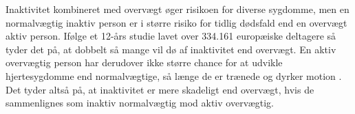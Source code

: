 Inaktivitet kombineret med overvægt øger risikoen for diverse sygdomme, men en normalvægtig inaktiv person er i større risiko for tidlig dødsfald end en overvægt aktiv person. Ifølge et 12-års studie lavet over 334.161 europæiske deltagere så tyder det på, at dobbelt så mange vil dø af inaktivitet end overvægt. \citep{Ekelund2015} En aktiv overvægtig person har derudover ikke større chance for at udvikle hjertesygdomme end normalvægtige, så længe de er trænede og dyrker motion \citep{Nichols2014}. Det tyder altså på, at inaktivitet er mere skadeligt end overvægt, hvis de sammenlignes som inaktiv normalvægtig mod aktiv overvægtig.

